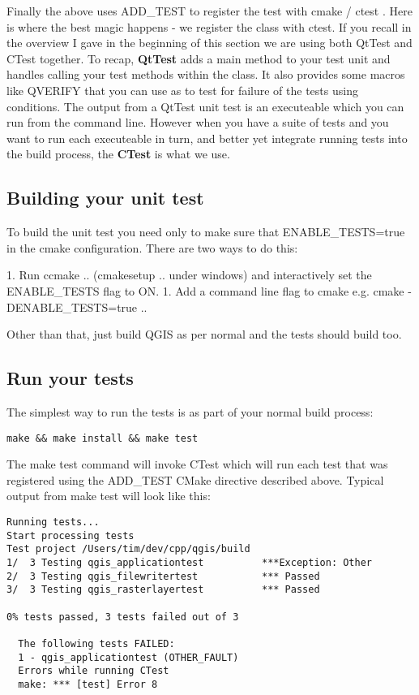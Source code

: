 Finally the above uses ADD\_TEST to register the test with cmake / ctest . Here
is where the best magic happens - we register the class with ctest. If you
recall in the overview I gave in the beginning of this section we are using
both QtTest and CTest together. To recap, \textbf{QtTest} adds a main method to your
test unit and handles calling your test methods within the class. It also
provides some macros like QVERIFY that you can use as to test for failure of
the tests using conditions. The output from a QtTest unit test is an
executeable which you can run from the command line.  However when you have a
suite of tests and you want to run each executeable in turn, and better yet
integrate running tests into the build process, the \textbf{CTest} is what we use. 

\hypertarget{toc52}{}
\subsection{Building your unit test}
To build the unit test you need only to make sure that ENABLE\_TESTS=true in the
cmake configuration. There are two ways to do this:

 1. Run ccmake .. (cmakesetup .. under windows) and interactively set 
 the ENABLE\_TESTS flag to ON.
 1. Add a command line flag to cmake e.g. cmake -DENABLE\_TESTS=true ..

Other than that, just build QGIS as per normal and the tests should build too.

\hypertarget{toc53}{}
\subsection{Run your tests}
The simplest way to run the tests is as part of your normal build process:

\begin{verbatim}
make && make install && make test
\end{verbatim}

The make test command will invoke CTest which will run each test that was
registered using the ADD\_TEST CMake directive described above. Typical output
from make test will look like this:

\begin{verbatim}
Running tests...
Start processing tests
Test project /Users/tim/dev/cpp/qgis/build
1/  3 Testing qgis_applicationtest          ***Exception: Other
2/  3 Testing qgis_filewritertest           *** Passed
3/  3 Testing qgis_rasterlayertest          *** Passed

0% tests passed, 3 tests failed out of 3

  The following tests FAILED:
  1 - qgis_applicationtest (OTHER_FAULT)
  Errors while running CTest
  make: *** [test] Error 8
\end{verbatim}

